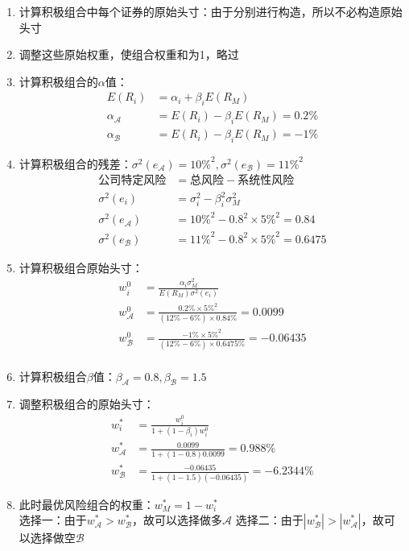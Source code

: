 \documentclass{article}
\begin{document}
\begin{enumerate}
    \item 计算积极组合中每个证券的原始头寸：由于分别进行构造，所以不必构造原始头寸
    \item 调整这些原始权重，使组合权重和为1，略过
    \item 计算积极组合的$\alpha$值：
    \begin{align}
        E(R_i)&=\alpha_i+\beta_iE(R_M)\\
        \alpha_\mathcal{A} &=E(R_i)-\beta_iE(R_M)=0.2\%\\
        \alpha_\mathcal{B} &=E(R_i)-\beta_iE(R_M)=-1\%
    \end{align}
    \item 计算积极组合的残差：$\sigma^2(e_\mathcal{A} )=10\%^2,\sigma^2(e_\mathcal{B} )=11\%^2$
    \begin{align}
        \text{公司特定风险}&=\text{总风险}-\text{系统性风险}\\
        \sigma^2(e_i)&=\sigma_i^2-\beta_i^2\sigma_M^2\\
        \sigma^2(e_\mathcal{A} )&=10\%^2-0.8^2\times 5\%^2=0.84\\
        \sigma^2(e_\mathcal{B} )&=11\%^2-0.8^2\times 5\%^2=0.6475
    \end{align}
    \item 计算积极组合原始头寸：
    \begin{align}
        w_i^0&=\frac{\alpha_i \sigma_M^2}{E\left(R_M\right) \sigma^2(e_i)}\\
        w_\mathcal{A} ^0&=\frac{0.2\% \times 5\%^2}{(12\%-6\%)\times 0.84\%}=0.0099\\
        w_\mathcal{B} ^0&=\frac{-1\% \times 5\%^2}{(12\%-6\%)\times 0.6475\%}=-0.06435\\
    \end{align}
    \item 计算积极组合$\beta$值：$\beta_\mathcal{A} =0.8,\beta_\mathcal{B} =1.5$
    \item 调整积极组合的原始头寸：
    \begin{align}
        w_i ^*&=\frac{w_i ^0}{1+(1-\beta_i ) w_i ^0}\\
        w_\mathcal{A} ^*&=\frac{0.0099}{1+(1-0.8)0.0099}=0.988\%\\
        w_\mathcal{B} ^*&=\frac{-0.06435}{1+(1-1.5)(-0.06435)}=-6.2344\%
    \end{align}
    \item 此时最优风险组合的权重：$w_M^*=1-w_i^*$\\
    选择一：由于$w_\mathcal{A} ^*>w_\mathcal{B} ^*$，故可以选择做多$\mathcal{A} $
    选择二：由于$|w_\mathcal{B} ^*|>|w_\mathcal{A} ^*|$，故可以选择做空$\mathcal{B} $
\end{enumerate}
\clearpage
\end{document}
